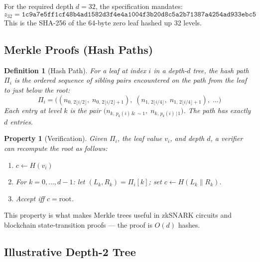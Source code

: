 \documentclass[12pt,a4paper]{article}
\newtheorem{definition}{Definition}
\newtheorem{property}{Property}
\begin{document}
For the required depth $d = 32$, the specification mandates:
\[
  z_{32} = \texttt{1c9a7e5ff1cf48b4ad1582d3f4e4a1004f3b20d8c5a2b71387a4254ad933ebc5}
\]
This is the SHA-256 of the 64-byte zero leaf hashed up 32 levels.

\subsection{Merkle Proofs (Hash Paths)}

\begin{definition}[Hash Path]
For a leaf at index $i$ in a depth-$d$ tree, the \emph{hash path}
$\Pi_i$ is the ordered sequence of sibling pairs encountered on the path
from the leaf to just below the root:
\[
  \Pi_i = \bigl((n_{0,\,2\lfloor i/2\rfloor},\; n_{0,\,2\lfloor i/2\rfloor+1}),\;
               (n_{1,\,2\lfloor i/4\rfloor},\; n_{1,\,2\lfloor i/4\rfloor+1}),\;
               \ldots\bigr)
\]
Each entry at level $k$ is the \emph{pair} $\bigl(n_{k,\,p_k(i)\,\&\,\sim1},\;
n_{k,\,p_k(i)\,|\,1}\bigr)$.  The path has exactly $d$ entries.
\end{definition}

\begin{property}[Verification]
Given $\Pi_i$, the leaf value $v_i$, and depth $d$, a verifier can recompute
the root as follows:
\begin{enumerate}
  \item $c \leftarrow H(v_i)$
  \item For $k = 0, \ldots, d-1$: let $(L_k, R_k) = \Pi_i[k]$;
        set $c \leftarrow H(L_k \| R_k)$.
  \item Accept iff $c = \mathrm{root}$.
\end{enumerate}
\end{property}

This property is what makes Merkle trees useful in zkSNARK circuits and
blockchain state-transition proofs — the proof is $O(d)$ hashes.

\subsection{Illustrative Depth-2 Tree}
\end{document}
